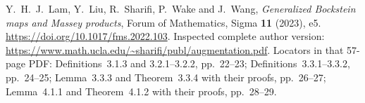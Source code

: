 Y.~H.~J.~Lam, Y.~Liu, R.~Sharifi, P.~Wake and J.~Wang,
\emph{Generalized Bockstein maps and Massey products},
Forum of Mathematics, Sigma \textbf{11} (2023), e5.
\url{https://doi.org/10.1017/fms.2022.103}.
Inspected complete author version:
\url{https://www.math.ucla.edu/~sharifi/publ/augmentation.pdf}.
Locators in that 57-page PDF: Definitions~3.1.3 and
3.2.1--3.2.2, pp.~22--23; Definitions~3.3.1--3.3.2,
pp.~24--25; Lemma~3.3.3 and Theorem~3.3.4 with their proofs,
pp.~26--27; Lemma~4.1.1 and Theorem~4.1.2 with their proofs,
pp.~28--29.
